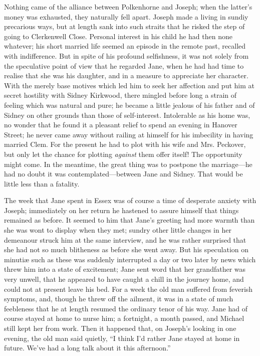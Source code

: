 Nothing came of the alliance between Polkenhorne and Joseph; when the
latter's money was exhausted, they naturally fell apart. Joseph made a
living in sundiy precarious ways, but at length sank into such
{\protect\hypertarget{183}{}{}}straits that he risked the step of going
to Clerkenwell Close. Personal interest in his child he had then none
whatever; his short married life seemed an episode in the remote past,
recalled with indifference. But in spite of his profound selfishness, it
was not solely from the speculative point of view that he regarded Jane,
when he had had time to realise that she was his daughter, and in a
measure to appreciate her character. With the merely base motives which
led him to seek her affection and put him at secret hostility with
Sidney Kirkwood, there mingled before long a strain of feeling which was
natural and pure; he became a little jealous of his father and of Sidney
on other grounds than those of self-interest. Intolerable as his home
was, no wonder that he found it a pleasant relief to spend an evening in
Hanover Street; he never came away without railing at himself for his
imbecility in having married Clem. For the present he had to plot with
his wife and Mrs. Peckover, but only let the chance for plotting
\emph{against} them offer itself! {\protect\hypertarget{184}{}{}}The
opportunity might come. In the meantime, the great thing was to postpone
the marriage---he had no doubt it was contemplated---between Jane and
Sidney. That would be little less than a fatality.

The week that Jane spent in Essex was of course a time of desperate
anxiety with Joseph; immediately on her return he hastened to assure
himself that things remained as before. It seemed to him that Jane's
greeting had more warmth than she was wont to display when they met;
sundry other little changes in her demeanour struck him at the same
interview, and he was rather surprised that she had not so much
blitheness as before she went away. But his speculation on minutiæ such
as these was suddenly interrupted a day or two later by news which threw
him into a state of excitement; Jane sent word that her grandfather was
very unwell, that he appeared to have caught a chill in the journey
home, and could not at present leave his bed. For a week the old man
suffered from feverish symptoms, and, though he threw off the
{\protect\hypertarget{185}{}{}}ailment, it was in a state of much
feebleness that he at length resumed the ordinary tenor of his way. Jane
had of course stayed at home to nurse him; a fortnight, a month passed,
and Michael still kept her from work. Then it happened that, on Joseph's
looking in one evening, the old man said quietly, ``I think I'd rather
Jane stayed at home in future. We've had a long talk about it this
afternoon.''


